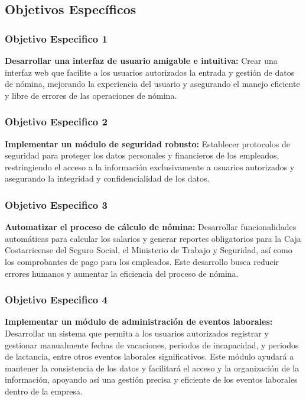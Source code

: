 \subsection{Objetivos Específicos}

\subsubsection*{Objetivo Especifico 1}
\textbf{Desarrollar una interfaz de usuario amigable e intuitiva:} Crear una interfaz
web que facilite a los usuarios autorizados la entrada y gestión de datos
de nómina, mejorando la experiencia del usuario y asegurando el manejo
eficiente y libre de errores de las operaciones de nómina.

\subsubsection*{Objetivo Especifico 2}
\textbf{Implementar un módulo de seguridad robusto:} Establecer protocolos de
seguridad para proteger los datos personales y financieros de los empleados,
restringiendo el acceso a la información exclusivamente a usuarios autorizados
y asegurando la integridad y confidencialidad de los datos.

\newpage

\subsubsection*{Objetivo Especifico 3}
\textbf{Automatizar el proceso de cálculo de nómina:} Desarrollar
funcionalidades automáticas para calcular los salarios y
generar reportes obligatorios para la Caja Costarricense del
Seguro Social, el Ministerio de Trabajo y Seguridad, así como los
comprobantes de pago para los empleados. Este desarrollo busca reducir
errores humanos y aumentar la eficiencia del proceso de nómina.

\subsubsection*{Objetivo Especifico 4}
\textbf{Implementar un módulo de administración de eventos laborales:} Desarrollar
un sistema que permita a los usuarios autorizados registrar y gestionar
manualmente fechas de vacaciones, periodos de incapacidad, y periodos de
lactancia, entre otros eventos laborales significativos. Este módulo ayudará
a mantener la consistencia de los datos y facilitará el acceso y la organización
de la información, apoyando así una gestión precisa y eficiente de los eventos
laborales dentro de la empresa.

